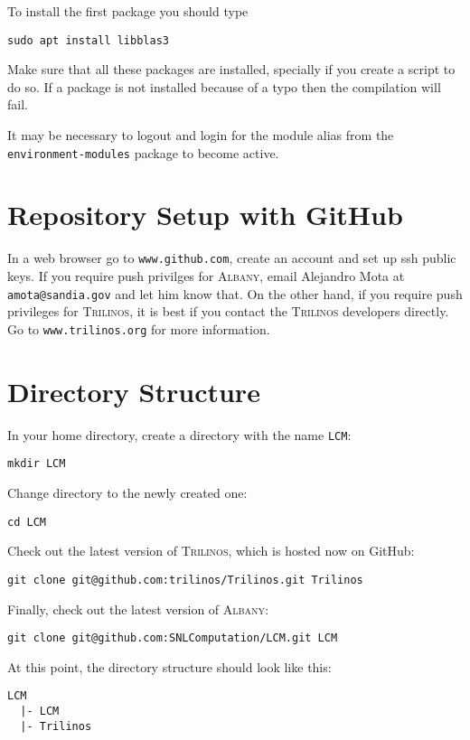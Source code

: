\documentclass{article}
\newcommand{\trilinos}{\textsc{Trilinos}}
\newcommand{\albany}{\textsc{Albany}}
\begin{document}
To install the
first package you should type
\begin{verbatim}
sudo apt install libblas3
\end{verbatim}

Make sure that all these packages are installed, specially if you
create a script to do so. If a package is not installed because of a
typo then the compilation will fail.

It may be necessary to logout and login for the module alias from the
\verb+environment-modules+ package to become active.

\section{Repository Setup with GitHub}
\label{sec:repo}

In a web browser go to \verb+www.github.com+, create an account and
set up ssh public keys. If you require push privilges for \albany{},
email Alejandro Mota at \verb+amota@sandia.gov+ and let him know
that. On the other hand, if you require push privileges for \trilinos{},
it is best if you contact the \trilinos{} developers directly. Go to
\verb+www.trilinos.org+ for more information.

\section{Directory Structure}
In your home directory, create a directory with the name \verb+LCM+:
\begin{verbatim}
mkdir LCM
\end{verbatim}

Change directory to the newly created one:
\begin{verbatim}
cd LCM
\end{verbatim}

Check out the latest version of \trilinos{}, which is hosted now on
GitHub:
\begin{verbatim}
git clone git@github.com:trilinos/Trilinos.git Trilinos
\end{verbatim}

Finally, check out the latest version of \albany{}:
\begin{verbatim}
git clone git@github.com:SNLComputation/LCM.git LCM
\end{verbatim}

At this point, the directory structure should look like this:
\begin{verbatim}
LCM
  |- LCM
  |- Trilinos
\end{verbatim}
\end{document}

